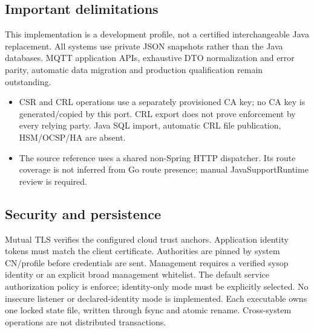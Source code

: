 \documentclass[a4paper]{arrowhead}
\begin{document}
\subsection{Important delimitations}
This implementation is a development profile, not a certified interchangeable Java replacement. All systems use private JSON snapshots rather than the Java databases. MQTT application APIs, exhaustive DTO normalization and error parity, automatic data migration and production qualification remain outstanding.
\begin{itemize}
\item CSR and CRL operations use a separately provisioned CA key; no CA key is generated/copied by this port. CRL export does not prove enforcement by every relying party. Java SQL import, automatic CRL file publication, HSM/OCSP/HA are absent.
\item The source reference uses a shared non-Spring HTTP dispatcher. Its route coverage is not inferred from Go route presence; manual JavaSupportRuntime review is required.
\end{itemize}
\subsection{Security and persistence}
Mutual TLS verifies the configured cloud trust anchors. Application identity tokens must match the client certificate. Authorities are pinned by system CN/profile before credentials are sent. Management requires a verified sysop identity or an explicit broad management whitelist. The default service authorization policy is enforce; identity-only mode must be explicitly selected. No insecure listener or declared-identity mode is implemented. Each executable owns one locked state file, written through fsync and atomic rename. Cross-system operations are not distributed transactions.
\clearpage
\end{document}

